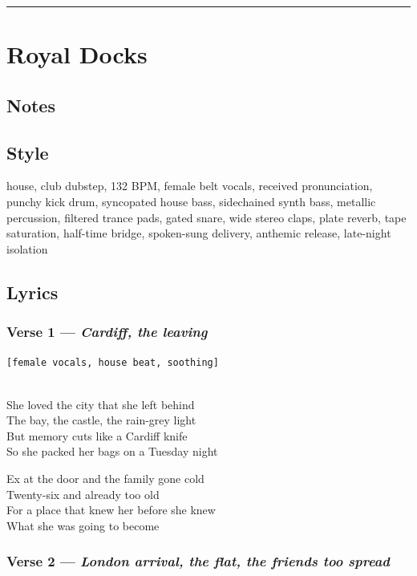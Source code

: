 \documentclass[]{article}
\begin{document}
\begin{center}\rule{0.5\linewidth}{0.5pt}\end{center}

\section{Royal Docks}\label{royal-docks}

\subsection{Notes}\label{notes-47}

\subsection{Style}\label{style-47}

house, club dubstep, 132 BPM, female belt vocals, received
pronunciation, punchy kick drum, syncopated house bass, sidechained
synth bass, metallic percussion, filtered trance pads, gated snare, wide
stereo claps, plate reverb, tape saturation, half-time bridge,
spoken-sung delivery, anthemic release, late-night isolation

\subsection{Lyrics}\label{lyrics-47}

\subsubsection{\texorpdfstring{Verse 1 --- \emph{Cardiff, the
leaving}}{Verse 1 --- Cardiff, the leaving}}\label{verse-1-cardiff-the-leaving}

\texttt{{[}female\ vocals,\ house\ beat,\ soothing{]}}\strut \\
She loved the city that she left behind\\
The bay, the castle, the rain-grey light\\
But memory cuts like a Cardiff knife\\
So she packed her bags on a Tuesday night

Ex at the door and the family gone cold\\
Twenty-six and already too old\\
For a place that knew her before she knew\\
What she was going to become

\subsubsection{\texorpdfstring{Verse 2 --- \emph{London arrival, the
flat, the friends too
spread}}{Verse 2 --- London arrival, the flat, the friends too spread}}\label{verse-2-london-arrival-the-flat-the-friends-too-spread}
\end{document}
